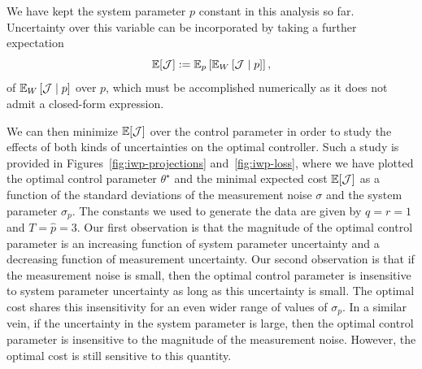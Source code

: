 We have kept the system parameter $p$ constant in this analysis so far.
Uncertainty over this variable can be incorporated by taking a further
expectation \[ \mathbb{E}[\mathcal{J}] := \mathbb{E}_p\left[\mathbb{E}_W\left[\mathcal{J}
\mid p \right]\right], \] of $\mathbb{E}_W\left[\mathcal{J} \mid p \right]$ over $p$,
which must be accomplished numerically as it does not admit a closed-form
expression.  

We can then minimize $\mathbb{E}[\mathcal{J}]$ over the control parameter in order to
study the effects of both kinds of uncertainties on the optimal controller.
%
Such a study is provided in Figures~\ref{fig:iwp-projections}
and~\ref{fig:iwp-loss}, where we have plotted the optimal control parameter
$\theta^\star$ and the minimal expected cost $\mathbb{E}[\mathcal{J}]$ as a function
of the standard deviations of the measurement noise $\sigma$ and the system
parameter $\sigma_p$. The constants we used to generate the data are given by
$q=r=1$ and $T=\hat{p}=3$. Our first observation is that the magnitude of the
optimal control parameter is an increasing function of system parameter
uncertainty and a decreasing function of measurement uncertainty. Our second
observation is that if the measurement noise is small, then the optimal control
parameter is insensitive to system parameter uncertainty as long as this
uncertainty is small. The optimal cost shares this insensitivity for an even
wider range of values of $\sigma_p$. In a similar vein, if the uncertainty in
the system parameter is large, then the optimal control parameter is insensitive
to the magnitude of the measurement noise. However, the optimal cost is still
sensitive to this quantity.

